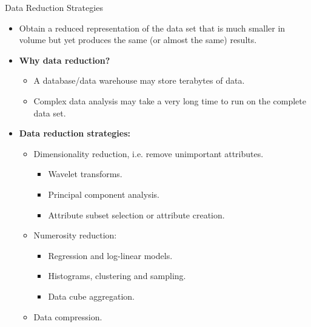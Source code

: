 \begin{frame}{Data Reduction Strategies}
	\begin{itemize}
		\item Obtain a reduced representation of the data set that is much 
		smaller in volume but yet produces the same (or almost the same)  
		results.
		\item \textbf{Why data reduction?}\\
		\begin{itemize}
			\item A database/data warehouse may store terabytes of data.
			\item Complex data analysis may take a very long time to run on the 
			complete data set.
		\end{itemize}
		\item \textbf{Data reduction strategies:}
		\begin{itemize}
			\item Dimensionality reduction, i.e. remove unimportant attributes.
			\begin{itemize}
				\item Wavelet transforms.
				\item Principal component analysis.
				\item Attribute subset selection or attribute creation.
			\end{itemize}
			\item Numerosity reduction:
			\begin{itemize}
				\item Regression and log-linear models.
				\item Histograms, clustering and sampling.
				\item Data cube aggregation.
			\end{itemize}
			\item Data compression.
		\end{itemize}
	\end{itemize}
\end{frame}


